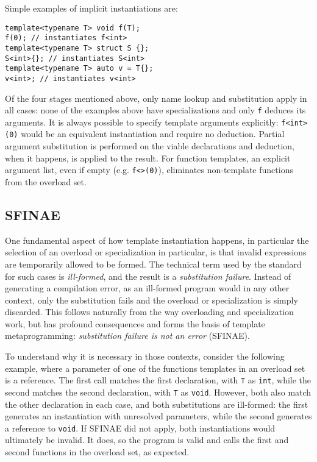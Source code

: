 Simple examples of implicit instantiations are:

\begin{lstlisting}[style=c++]
template<typename T> void f(T);
f(0); // instantiates f<int>
template<typename T> struct S {};
S<int>{}; // instantiates S<int>
template<typename T> auto v = T{};
v<int>; // instantiates v<int>
\end{lstlisting}

Of the four stages mentioned above, only name lookup and substitution apply in
all cases: none of the examples above have specializations and only \texttt{f}
deduces its arguments.  It is always possible to specify template arguments
explicitly: \texttt{f<int>(0)} would be an equivalent instantiation and require
no deduction.  Partial argument substitution is performed on the viable
declarations and deduction, when it happens, is applied to the result.  For
function templates, an explicit argument list, even if empty (e.g.
\texttt{f<>(0)}), eliminates non-template functions from the overload set.

\subsection{SFINAE}

One fundamental aspect of how template instantiation happens, in particular the
selection of an overload or specialization in particular, is that invalid
expressions are temporarily allowed to be formed.  The technical term used by
the standard for such cases is \textit{ill-formed}, and the result is a
\textit{substitution failure}.  Instead of generating a compilation error, as an
ill-formed program would in any other context, only the substitution fails and
the overload or specialization is simply discarded.  This follows naturally from
the way overloading and specialization work, but has profound consequences and
forms the basis of template metaprogramming: \textit{substitution failure is not
an error} (SFINAE).

To understand why it is necessary in those contexts, consider the following
example, where a parameter of one of the functions templates in an overload set
is a reference.  The first call matches the first declaration, with \texttt{T}
as \texttt{int}, while the second matches the second declaration, with
\texttt{T} as \texttt{void}.  However, both also match the other declaration in
each case, and both substitutions are ill-formed: the first generates an
instantiation with unresolved parameters, while the second generates a reference
to \texttt{void}.  If SFINAE did not apply, both instantiations would ultimately
be invalid.  It does, so the program is valid and calls the first and second
functions in the overload set, as expected.

